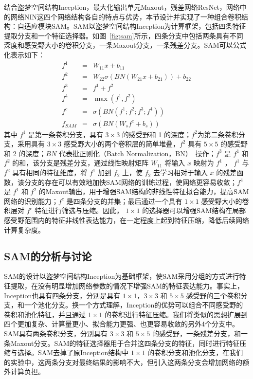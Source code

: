 结合盗梦空间结构Inception，最大化输出单元Maxout，残差网络ResNet，网络中的网络NIN这四个网络结构各自的特点与优势，本节设计并实现了一种组合卷积结构：自适应模块SAM。SAM以盗梦空间结构Inception为计算框架，包括四条特征提取分支和一个特征选择器。如图~\ref{fig:sam}所示，四条分支中包括两条具有不同深度和感受野大小的卷积分支，一条Maxout分支，一条残差分支。SAM可以公式化表示如下：
\begin{eqnarray} \label{equ:sam}
f^{1} &=& W_{11}x+b_{11} \nonumber\\
f^{2} &=& W_{22}\sigma(BN(W_{21}x+b_{21}))+b_{22} \nonumber\\
f^{3} &=& f^{1}+f^{2} \nonumber\\
f^{4} &=& \max(f^1, f^2) \nonumber\\
f^{c} &=& {\sigma}(BN(f^1; f^2; f^3; f^4)) \nonumber\\
f_{SAM} &=& {\sigma}(BN(W_{s}f^{c}+b_{s}))
\end{eqnarray}
其中 $f^{1}$ 是第一条卷积分支，具有 $3\times3$ 的感受野和 1 的深度；$f^{2}$为第二条卷积分支，采用具有 $3\times3$ 感受野大小的两个卷积层的简单堆叠，$f^{2}$ 具有 $5\times5$ 的感受野和 2 的深度；$BN$ 代表批正则化（Batch Normalization，BN）~\cite{ioffe2015batch}操作；$f^{3}$ 是 $f^{1}$ 和 $f^{2}$ 的和，该分支是残差分支，通过线性映射矩阵 $W_{11}$ 将输入 $x$ 映射为 $f^{1}$ ， $f^{1}$ 与 $f^{2}$ 具有相同的特征维度，将 $f^{1}$ 加到 $f_{2}$ 上，使 $f_{2}$ 去学习相对于输入 $x$ 的残差函数，该分支的存在可以有效地加快SAM网络的训练过程，使网络更容易收敛；$f^{4}$ 是 $f^{1}$ 和 $f^{2}$ 的Maxout输出，用于增强SAM结构的非线性特征拟合能力，提高SAM网络的识别能力；$f^{c}$ 是四条分支的并集；最后通过一个具有 $1\times1$ 感受野大小的卷积层对 $f^{c}$ 特征进行筛选与压缩。因此， $1\times1$ 的选择器可以增强SAM结构在局部感受野范围内的特征非线性表达能力，在一定程度上起到特征压缩，降低后续网络计算复杂度。

\subsection{SAM的分析与讨论}
\label{sec:sap:model:discuss}

SAM的设计以盗梦空间结构Inception为基础框架，使SAM采用分组的方式进行特征提取，在没有明显增加网络参数的情况下增强SAM的特征表达能力。事实上，Inception也具有四条分支，分别是具有 $1\times1$，$3\times3$ 和 $5\times5$ 感受野的三个卷积分支，和一个池化分支。换一个方式理解，Inception的优势可以组合不同感受野的卷积和池化特征，并且通过 $1\times1$ 的卷积进行特征压缩。我们将类似的思想扩展到四个更加复杂、计算量更小、拟合能力更强、也更容易收敛的另外4个分支中。SAM具有两条卷积分支，分别具有 $3\times3$ 和 $5\times5$ 的感受野，一条残差分支，和一条Maxout分支。SAM的特征选择器用于合并这四条分支的特征，同时进行特征压缩与选择。SAM去掉了原Inception结构中 $1\times1$ 的卷积分支和池化分支，在我们的实验中，这两条分支对最终结果的影响不大，但引入这两条分支会增加网络的额外计算负担。

